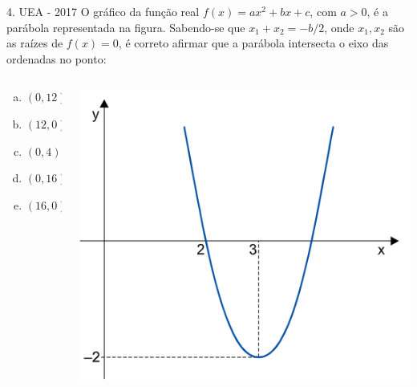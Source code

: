 \documentclass[11pt]{beamer}
\begin{document}
\begin{frame}{4. UEA - 2017}
    O gráfico da função real $f(x)=ax^{2}+ bx + c$, com $a > 0$, é a parábola representada na figura. Sabendo-se que $x_{1}+x_{2}= -{b}/2$, onde $ x_{1}, x_ {2}$ são as raízes de $f(x) = 0$, é correto afirmar que a parábola intersecta o eixo das ordenadas no ponto:

    \begin{columns}
        \begin{column}{0.4\textwidth}
            \begin{enumerate}[a)]
                \item $(0,12)$ 
                \item $(12,0)$
                \item $(0,4)$ 
                \item $(0,16)$ %
                \item $(16,0)$
            \end{enumerate}
        \end{column}

        \begin{column}{0.5\textwidth}
            \centering
            \includegraphics[width=0.8\linewidth]{imagens/uea-macro-2017(2).png}
        \end{column}
    \end{columns}
    
\end{frame}
\end{document}
